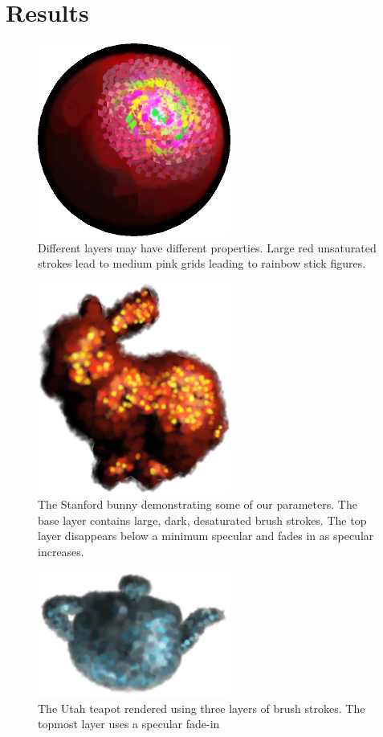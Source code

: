 \documentclass[conference]{acmsiggraph}
\begin{document}
\section{Results}

\begin{figure}
  \centering
  \includegraphics[width=2.5in]{images/betterMyBall}
  \caption{Different layers may have different properties. Large red
           unsaturated strokes lead to medium pink grids leading to rainbow
           stick figures.}
\end{figure}

\begin{figure}
  \centering
  \includegraphics[width=2.5in]{images/MagmaBunny}
  \caption{The Stanford bunny demonstrating some of our parameters. The base
           layer contains large, dark, desaturated brush strokes. The top layer
           disappears below a minimum specular and fades in as specular
           increases.}
\end{figure}

\begin{figure}
  \centering
  \includegraphics[width=2.5in]{images/teapot_cropped}
  \caption{The Utah teapot rendered using three layers of brush strokes.
           The topmost layer uses a specular fade-in}
\end{figure}
\end{document}
